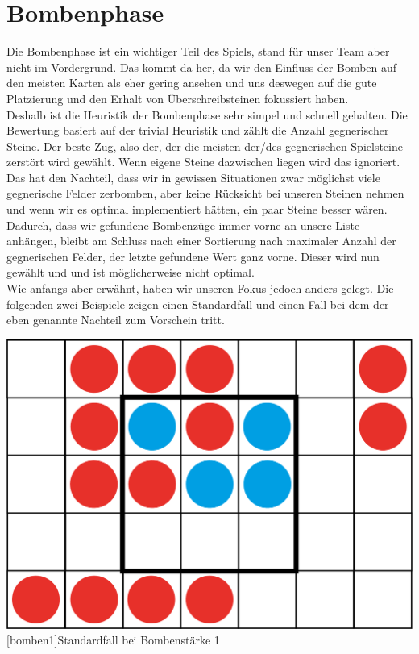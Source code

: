 \documentclass[12pt,a4paper,bibliography=totocnumbered,listof=totocnumbered]{scrartcl}
\begin{document}
    \newpage
    
    \section{Bombenphase}
    \vspace{1em}
    
    Die Bombenphase ist ein wichtiger Teil des Spiels, stand für unser Team aber nicht im Vordergrund. Das kommt da her, da wir den Einfluss der Bomben auf den meisten Karten als eher gering ansehen und uns deswegen auf die gute Platzierung und den Erhalt von Überschreibsteinen fokussiert haben.\\
    Deshalb ist die Heuristik der Bombenphase sehr simpel und schnell gehalten. Die Bewertung basiert auf der trivial Heuristik und zählt die Anzahl gegnerischer Steine. Der beste Zug, also der, der die meisten der/des gegnerischen Spielsteine zerstört wird gewählt. Wenn eigene Steine dazwischen liegen wird das ignoriert. Das hat den Nachteil, dass wir in gewissen Situationen zwar möglichst viele gegnerische Felder zerbomben, aber keine Rücksicht bei unseren Steinen nehmen und wenn wir es optimal implementiert hätten, ein paar Steine besser wären. Dadurch, dass wir gefundene Bombenzüge immer vorne an unsere Liste anhängen, bleibt am Schluss nach einer Sortierung nach maximaler Anzahl der gegnerischen Felder, der letzte gefundene Wert ganz vorne. Dieser wird nun gewählt und und ist möglicherweise nicht optimal.\\
    Wie anfangs aber erwähnt, haben wir unseren Fokus jedoch anders gelegt. Die folgenden zwei Beispiele zeigen einen \glqq Standardfall\grqq{} und einen Fall bei dem der eben genannte Nachteil zum Vorschein tritt.

	\vspace{1em}
	\begin{minipage}{\linewidth}
		\centering
		\includegraphics[width=0.6\linewidth]{pics/Kapitel_5/Kapitel_5_pic1.png}
		[bomben1]{\glqq Standardfall\grqq{} bei Bombenstärke 1}
		\label{fig:bomben1}
	\end{minipage}
	\vspace{1em}
	
\end{document}
